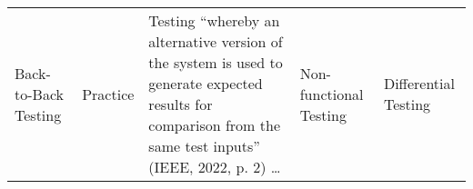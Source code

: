 \begin{table}[hbtp!]
\begin{tabularx}{\linewidth}{|m{1.8cm}|>{\raggedright\arraybackslash}m{3.5cm}|>{\raggedright\arraybackslash}X|>{\raggedright\arraybackslash}m{4.25cm}|>{\raggedright\arraybackslash}m{4.25cm}|}
        Back-to-Back Testing & Practice \citep[p.~22]{IEEE2022}                                          & Testing ``whereby an alternative version of the system is used to generate expected results for comparison from the same test inputs'' \citep[p.~2]{IEEE2022} (IEEE, 2022, p. 2) \dots{}                                               & Non-functional Testing \citep[p.~5\=/9]{SWEBOK2025}                                             & Differential Testing \citep[p.~2]{IEEE2022}                                                                                    \\[1.5cm]

\end{tabularx}
\end{table}
